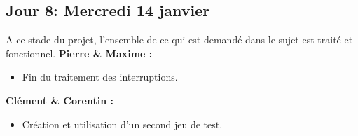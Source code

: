 \documentclass[11pt]{article} %
\begin{document}
\subsection{Jour 8: Mercredi 14 janvier}
A ce stade du projet, l'ensemble de ce qui est demand\'e dans le sujet est trait\'e et fonctionnel.
\newline
\newline
\textbf{Pierre \& Maxime :}
\begin{itemize}
  \item Fin du traitement des interruptions.
\end{itemize}
\textbf{Cl\'ement \& Corentin :}
\begin{itemize}
  \item Création et utilisation d'un second jeu de test.
\end{itemize}
\end{document}
